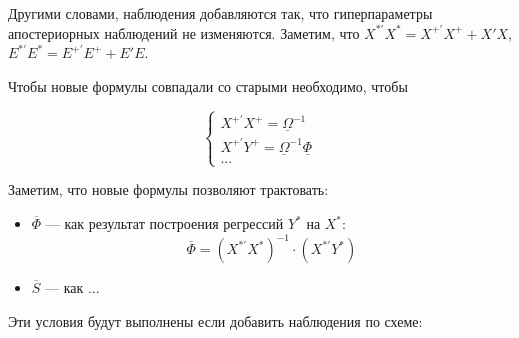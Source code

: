 \documentclass[11pt]{article} %
\newcommand{\prior}{\underline}
\newcommand{\post}{\overline}
\let\vec\relax
\DeclareMathOperator{\vec}{vec}
\begin{document}

Другими словами, наблюдения добавляются так, что гиперпараметры апостериорных наблюдений не изменяются. Заметим, что $X^{*\prime}X^*=X^{+\prime}X^+ + X'X$, $E^{*\prime}E^*=E^{+\prime}E^+ + E'E$.

Чтобы новые формулы совпадали со старыми необходимо, чтобы

\begin{equation}
\begin{cases}
X^{+\prime}X^+=\prior \Omega^{-1} \\
X^{+\prime}Y^+=\prior \Omega^{-1}\prior \Phi \\
...
\end{cases}
\end{equation}







Заметим, что новые формулы позволяют трактовать:
\begin{itemize}
\item $\post \Phi$ --- как результат построения регрессий $Y^*$ на $X^*$:
\[
\post \Phi=(X^{*\prime}X^*)^{-1}\cdot (X^{*\prime}Y^*)
\]
\item $\post S$ --- как ...
\end{itemize}




Эти условия будут выполнены если добавить наблюдения по схеме:
\end{document}
